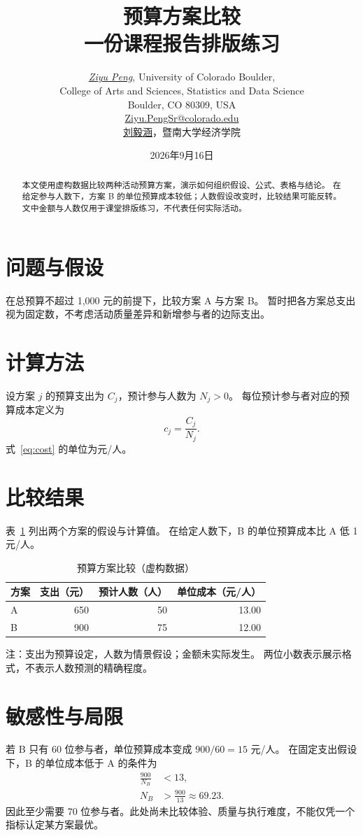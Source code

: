 \documentclass[UTF8,a4paper,fontset=fandol]{ctexart}
\title{预算方案比较\\[0.5em]\large 一份课程报告排版练习}
\author{\href{https://github.com/pzy54154631-hub}{\textit{Ziyu Peng}}, University of Colorado Boulder,
  \\[0.1em]College of Arts and Sciences, Statistics and Data Science
  \\[0.1em]Boulder, CO 80309, USA
  \\[0.1em]\href{mailto:Ziyu.PengSr@colorado.edu}{Ziyu.PengSr@colorado.edu}
  \\[0.35em]
  \href{https://pzy54154631-hub.github.io/liuyihan/}{刘毅涵}，暨南大学经济学院}
\date{2026年9月16日}
\begin{document}
\maketitle
\vspace{-\baselineskip}
\begin{abstract}
本文使用虚构数据比较两种活动预算方案，演示如何组织假设、公式、表格与结论。
在给定参与人数下，方案 B 的单位预算成本较低；人数假设改变时，比较结果可能反转。
文中金额与人数仅用于课堂排版练习，不代表任何实际活动。
\end{abstract}
\tableofcontents
\section{问题与假设}
在总预算不超过 1,000 元的前提下，比较方案 A 与方案 B。
暂时把各方案总支出视为固定数，不考虑活动质量差异和新增参与者的边际支出。
\section{计算方法}
设方案 $j$ 的预算支出为 $C_j$，预计参与人数为 $N_j>0$。
每位预计参与者对应的预算成本定义为
\begin{equation}
  c_j=\frac{C_j}{N_j}.
  \label{eq:cost}
\end{equation}
式~\eqref{eq:cost} 的单位为元/人。
\section{比较结果}
\label{sec:results}
表~\ref{tab:plans} 列出两个方案的假设与计算值。
在给定人数下，B 的单位预算成本比 A 低 1 元/人。
\begin{table}[htbp]
\centering
\caption{预算方案比较（虚构数据）}
\label{tab:plans}
\begin{tabular}{lrrr}
\toprule
方案 & 支出（元） & 预计人数（人） & 单位成本（元/人） \\
\midrule
A & 650 & 50 & 13.00 \\
B & 900 & 75 & 12.00 \\
\bottomrule
\end{tabular}
\par\smallskip
\begin{minipage}{0.9\linewidth}\small
注：支出为预算设定，人数为情景假设；金额未实际发生。
两位小数表示展示格式，不表示人数预测的精确程度。
\end{minipage}
\end{table}
\section{敏感性与局限}
若 B 只有 60 位参与者，单位预算成本变成 $900/60=15$ 元/人。
在固定支出假设下，B 的单位成本低于 A 的条件为
\begin{align}
  \frac{900}{N_B}&<13,\\
  N_B&>\frac{900}{13}\approx69.23.
\end{align}
因此至少需要 70 位参与者。此处尚未比较体验、质量与执行难度，不能仅凭一个指标认定某方案最优。
\end{document}
